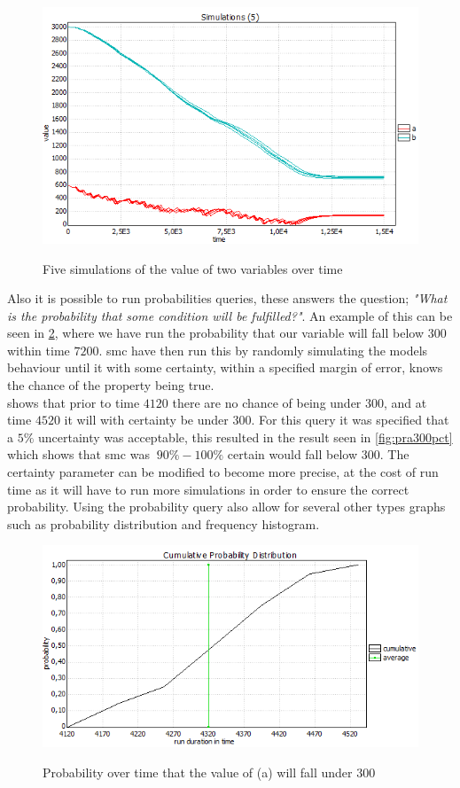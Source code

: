 \begin{figure}[h]
	\includegraphics[width=\textwidth]{graphics/simab.png}
	\label{fig:simab}
	\caption{Five simulations of the value of two variables  over time}
\end{figure}

Also it is possible to run probabilities queries, these answers the question; \textit{"What is the probability that some condition will be fulfilled?"}. An example of this can be seen in \cref{fig:pra300}, where we have run the probability that our variable  will fall below $300$ within time $7200$. \Gls{smc} have then run this by randomly simulating the models behaviour until it with some certainty, within a specified margin of error, knows the chance of the property being true.\\
 shows that prior to time $4120$ there are no chance of  being under $300$, and at time $4520$ it will with certainty be under $300$. For this query it was specified that a $5\%$ uncertainty was acceptable, this resulted in the result seen in \cref{fig:pra300pct} which shows that \gls{smc} was $~90\% - 100\%$ certain  would fall below $300$. The certainty parameter can be modified to become more precise, at the cost of run time as it will have to run more simulations in order to ensure the correct probability. Using the probability query also allow  for several other types graphs such as probability distribution and frequency histogram.

\begin{figure}[h]
	\includegraphics[width=\textwidth]{graphics/pra300.png}
	\label{fig:pra300}
	\caption{Probability over time that the value of (a) will fall under 300}
\end{figure}

